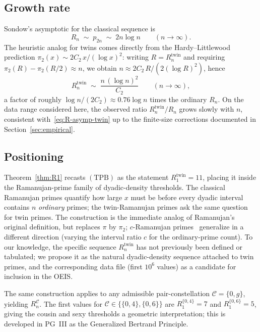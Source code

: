\documentclass[11pt]{article}
\begin{document}
\subsection{Growth rate}

Sondow's asymptotic for the classical sequence is
\begin{equation}\label{eq:R-asymp-classical}
R_n \;\sim\; p_{2n} \;\sim\; 2n\log n
\qquad(n\to\infty).
\end{equation}
The heuristic analog for twins comes directly from the
Hardy--Littlewood prediction
$\pi_2(x)\sim 2C_2\,x/(\log x)^2$: writing
$R=R^{\mathrm{twin}}_n$ and requiring
$\pi_2(R)-\pi_2(R/2)\approx n$, we obtain
$n\approx 2C_2\,R/(2(\log R)^2)$, hence
\begin{equation}\label{eq:R-asymp-twin}
R^{\mathrm{twin}}_n \;\sim\; \frac{n\,(\log n)^2}{C_2} \qquad(n\to\infty),
\end{equation}
a factor of roughly $\log n /(2C_2) \approx 0.76\log n$ times the
ordinary $R_n$. On the data range considered here, the observed ratio
$R^{\mathrm{twin}}_n / R_n$ grows slowly with $n$, consistent
with~\eqref{eq:R-asymp-twin} up to the finite-size corrections
documented in Section~\ref{sec:empirical}.

\subsection{Positioning}

Theorem~\ref{thm:R1} recasts $(\mathrm{TPB})$ as the statement
$R^{\mathrm{twin}}_1 = 11$, placing it inside the
Ramanujan-prime family of dyadic-density thresholds. The classical
Ramanujan primes quantify how large $x$ must be before every dyadic
interval contains $n$ \emph{ordinary} primes; the twin-Ramanujan
primes ask the same question for twin primes. The construction is
the immediate analog of Ramanujan's original definition, but replaces
$\pi$ by $\pi_2$; $c$-Ramanujan primes~\cite{Amersi2014} generalize
in a different direction (varying the interval ratio $c$ for the
ordinary-prime count). To our knowledge, the specific sequence
$R^{\mathrm{twin}}_n$ has not previously been defined or tabulated;
we propose it as the natural dyadic-density sequence attached to
twin primes, and the corresponding data file (first $10^6$ values)
as a candidate for inclusion in the OEIS.

The same construction applies to any admissible pair-constellation
$\mathcal{C} = \{0, g\}$, yielding $R^{\mathcal{C}}_n$. The first
values for $\mathcal{C} \in \{\{0,4\},\{0,6\}\}$ are
$R^{\{0,4\}}_1 = 7$ and $R^{\{0,6\}}_1 = 5$, giving the cousin and
sexy thresholds a geometric interpretation; this is developed in
PG~III as the Generalized Bertrand Principle.
\end{document}
